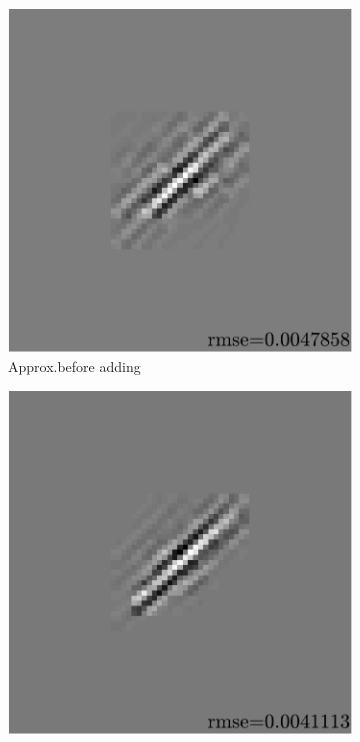 \begin{figure}[!h]
\begin{subfigure}[b]{0.32\linewidth}
\includegraphics[width=\linewidth]{figures/before_after/xp_128x128_sc2_angl1_K3_S3_node4before_approx.pdf}
\caption{Approx.\@ before adding}\label{fig_beforeafter-approx_before}
\end{subfigure}
\begin{subfigure}[b]{0.32\linewidth}\centering
\includegraphics[width=\linewidth]{figures/before_after/xp_128x128_sc2_angl1_K3_S3_node4after_approx.pdf}

\end{subfigure}
\end{figure}
